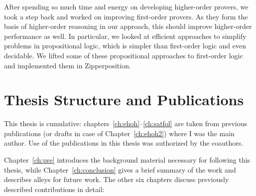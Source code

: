   
  After spending so much time and energy on developing higher-order provers, we
  took a step back and worked on improving first-order provers. As they form the
  basis of higher-order reasoning in our approach, this should improve
  higher-order performance as well. In particular, we looked at efficient
  approaches to simplify problems in propositional logic, which is simpler than
  first-order logic and even decidable. We lifted some of these propositional
  approaches to first-order logic and implemented them in Zipperposition. 

\section{Thesis Structure and Publications}

This thesis is cumulative: chapters~\ref{ch:ehoh}--\ref{ch:satfol}  are
taken from previous publications (or drafts in case of
Chapter~\ref{ch:ehoh2}) where I was the main author. Use
of the publications in this thesis was authorized by the coauthors. 

Chapter~\ref{ch:pre} introduces the background material necessary for following this thesis,
while Chapter~\ref{ch:conclusion} gives a brief summary of the work and describes alleys for future work.
The other six chapters discuss previously described contributions in detail:

